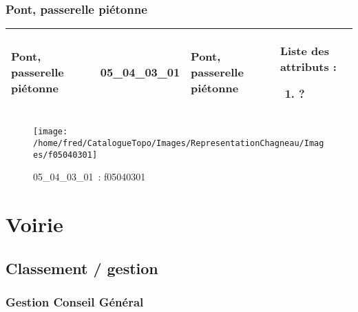 \documentclass[12pt,titlepage]{book}
\begin{document}
\subsection{Pont, passerelle piétonne}
\noindent
\vspace{\baselineskip}

\renewcommand{\arraystretch}{1.2}
\begin{supertabular}{|p{10cm}|c|p{13cm}|p{12cm}|}
 Pont, passerelle piétonne & 05\_04\_03\_01 & Pont, passerelle piétonne & Liste des attributs :
\begin{enumerate}
  \item ?\end{enumerate}
\\
\hline
\end{supertabular}
\begin{figure}[h!]
  \hfill         %
  \begin{minipage}[t]{3cm}
    \begin{center}
      \texttt{[image: /home/fred/CatalogueTopo/Images/RepresentationChagneau/Images/f05040301]}
      \caption[~05\_04\_03\_01]{\small{05\_04\_03\_01~:} \tiny{f05040301}}\label{f05040301}
    \end{center}
  \end{minipage}
\end{figure}
\chapter{Voirie}
\section{\large Classement / gestion}
\subsection{Gestion Conseil Général}
\noindent
\vspace{\baselineskip}
\end{document}
